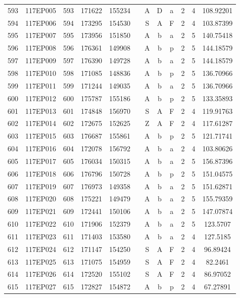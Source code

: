 \begin{tabular}{|*{12}{c|}}
593 & 117EP005 & 593 & 171622 & 155234 &  & A & D & a & 2 & 4 & 108.92201 \\ 
594 & 117EP006 & 594 & 173295 & 154530 &  & S & A & F & 2 & 4 & 103.87399 \\ 
595 & 117EP007 & 595 & 173956 & 151850 &  & A & b & a & 2 & 5 & 140.75418 \\ 
596 & 117EP008 & 596 & 176361 & 149908 &  & A & b & p & 2 & 5 & 144.18579 \\ 
597 & 117EP009 & 597 & 176390 & 149728 &  & A & b & a & 2 & 5 & 144.18579 \\ 
598 & 117EP010 & 598 & 171085 & 148836 &  & A & b & p & 2 & 5 & 136.70966 \\ 
599 & 117EP011 & 599 & 171244 & 149035 &  & A & b & a & 2 & 5 & 136.70966 \\ 
600 & 117EP012 & 600 & 175787 & 155186 &  & A & b & p & 2 & 5 & 133.35893 \\ 
601 & 117EP013 & 601 & 174848 & 156970 &  & S & A & F & 2 & 4 & 119.91763 \\ 
602 & 117EP014 & 602 & 172675 & 152625 &  & Z & A & F & 2 & 4 & 117.61287 \\ 
603 & 117EP015 & 603 & 176687 & 155861 &  & A & b & p & 2 & 5 & 121.71741 \\ 
604 & 117EP016 & 604 & 172078 & 156792 &  & A & b & a & 2 & 4 & 103.80626 \\ 
605 & 117EP017 & 605 & 176034 & 150315 &  & A & b & a & 2 & 5 & 156.87396 \\ 
606 & 117EP018 & 606 & 176796 & 150728 &  & A & b & p & 2 & 5 & 151.04575 \\ 
607 & 117EP019 & 607 & 176973 & 149358 &  & A & b & a & 2 & 5 & 151.62871 \\ 
608 & 117EP020 & 608 & 175221 & 149479 &  & A & b & a & 2 & 5 & 155.79359 \\ 
609 & 117EP021 & 609 & 172441 & 150106 &  & A & b & a & 2 & 5 & 147.07874 \\ 
610 & 117EP022 & 610 & 171906 & 152379 &  & A & b & a & 2 & 5 & 123.5707 \\ 
611 & 117EP023 & 611 & 171403 & 153580 &  & A & b & a & 2 & 4 & 127.5185 \\ 
612 & 117EP024 & 612 & 171147 & 154250 &  & S & A & F & 2 & 4 & 96.89424 \\ 
613 & 117EP025 & 613 & 171075 & 154959 &  & S & A & F & 2 & 4 & 82.2461 \\ 
614 & 117EP026 & 614 & 172520 & 155102 &  & S & A & F & 2 & 4 & 86.97052 \\ 
615 & 117EP027 & 615 & 172827 & 154872 &  & A & b & p & 2 & 4 & 67.27891 \\ 

\end{tabular}
